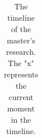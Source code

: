 \begin{table}[ht]
\begin{tabular}{lllllllllll}
\end{tabular}
\caption{The timeline of the master's research. The "x" represents the current moment in the timeline.}
\end{table}
